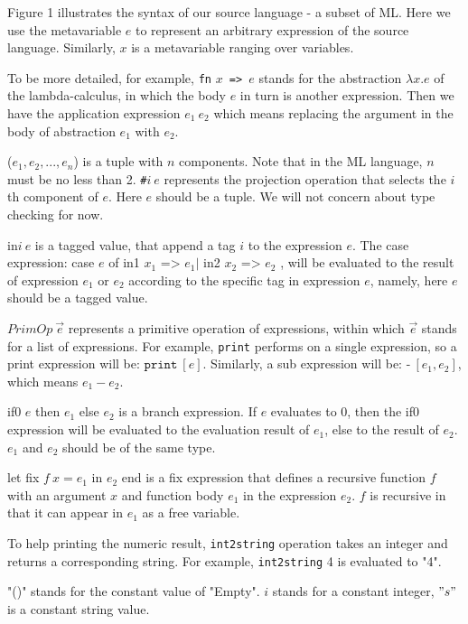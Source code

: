 \documentclass{article}
\theoremstyle{definition}
\theoremstyle{remark}
\numberwithin{equation}{section}
\begin{document}
Figure 1 illustrates the syntax of our source language - a subset
 of ML. Here we use the metavariable $e$ to represent an arbitrary
 expression of the source language. Similarly, $x$ is a metavariable
ranging over variables.

To be more detailed, for example, \texttt{fn} $x$\texttt{ => }$e$
stands for the abstraction $\lambda x. e$ of the lambda-calculus, in
 which the body $e$ in turn is another expression. Then we have the application
 expression $e_1\ e_2$ which means replacing the argument in the body of
 abstraction $e_1$ with $e_2$.

($e_1,e_2, ..., e_n$) is a tuple with $n$ components. Note that in the
ML language, $n$ must be no less than 2.
 \texttt{\#}$i\ e$ represents  the projection operation that selects
  the $i$th component of $e$. Here $e$ should be a tuple. We will
not concern about type checking for now.

\textsf{in}$i\ e$ is a tagged value, that append a tag $i$ to the
expression $e$. The case expression: \textsf{case }$e$ \textsf{of in1 }
$x_1\texttt{ => } e_1|$ \textsf{in2 }$x_2 \texttt{ => } e_2$ ,
will be evaluated to the result of expression $e_1$ or $e_2$ according to
the specific tag in expression $e$, namely, here $e$ should be a tagged
value.

$PrimOp\ \vec{e}$ represents a primitive operation of expressions,
within which $\vec{e}$ stands for a list of expressions. For example,
\texttt{print} performs on a single expression, so a print expression will be:
 $\texttt{print}\ [e]$. Similarly, a sub expression will be:
 $\texttt{-}\ [e_1, e_2]$, which means $e_1 - e_2$.

\textsf{if0 }$e$\textsf{ then }$e_1$\textsf{ else }$e_2$ is a branch
expression. If $e$ evaluates to 0, then the if0 expression will be
evaluated to the evaluation result of $e_1$, else to the result of
$e_2$. $e_1$ and $e_2$ should be of the same type.

\textsf{let fix }$f\ x=e_1$\textsf{ in }$e_2$\textsf{ end} is a fix
expression that defines a recursive function $f$ with an argument
$x$ and function body $e_1$ in the expression $e_2$. $f$ is recursive
in that it can appear in $e_1$ as a free variable.

To help printing the numeric result, \texttt{int2string}
operation takes an integer and returns a corresponding
string. For example, \texttt{int2string} 4 is evaluated to "4".

"\textsf{()}" stands for the constant value of "Empty". $i$ stands for
a constant integer, $"s"$ is a constant string value.
\end{document}
